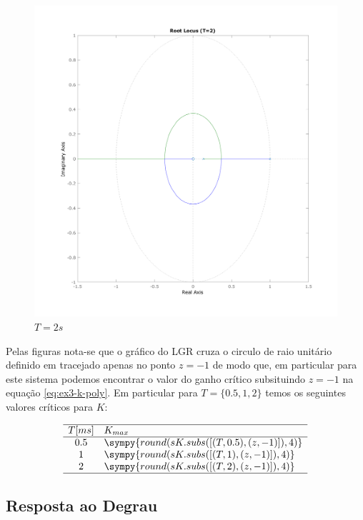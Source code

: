 \documentclass[a4paper,11pt]{article}
\newcommand{\npy}[1]{\sympy{round(#1,4)}}
\begin{document}
\begin{figure}[H]
    \centering
    \includegraphics[width=0.9\linewidth]{img/exsim3-rlocus-t2000ms.png}
    \caption{ $T=2s$}
\end{figure}

Pelas figuras nota-se que o gráfico do LGR cruza o circulo de raio unitário definido em tracejado apenas no ponto $z=-1$ de modo que, em particular para este sistema podemos encontrar o valor do ganho crítico subsituindo $z=-1$ na equação \ref{eq:ex3-k-poly}. Em particular para $T=\{0.5,1,2\}$ temos os seguintes valores críticos para $K$:

\begin{table}[H]
    $$
    \begin{array}{cl}
        \hline
        T [ms] & K_{max} \\
        \hline
        0.5 & \npy{sK.subs([(T,0.5),(z,-1)])}\\
        1 & \npy{sK.subs([(T,1),(z,-1)])}\\
        2 & \npy{sK.subs([(T,2),(z,-1)])}\\
        \hline
    \end{array}
    $$
\end{table}

\subsection{Resposta ao Degrau} 
\end{document}
